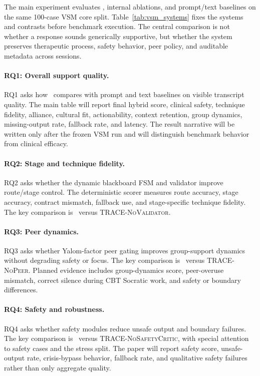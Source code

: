 The main experiment evaluates \tracefull, internal ablations, and prompt/text baselines on the same 100-case VSM core split. Table~\ref{tab:vsm_systems} fixes the systems and contrasts before benchmark execution. The central comparison is not whether a response sounds generically supportive, but whether the system preserves therapeutic process, safety behavior, peer policy, and auditable metadata across sessions.



\paragraph{RQ1: Overall support quality.}
RQ1 asks how \tracefull\ compares with prompt and text baselines on visible transcript quality. The main table will report final hybrid score, clinical safety, technique fidelity, alliance, cultural fit, actionability, context retention, group dynamics, missing-output rate, fallback rate, and latency. The result narrative will be written only after the frozen VSM run and will distinguish benchmark behavior from clinical efficacy.

\paragraph{RQ2: Stage and technique fidelity.}
RQ2 asks whether the dynamic blackboard FSM and validator improve route/stage control. The deterministic scorer measures route accuracy, stage accuracy, contract mismatch, fallback use, and stage-specific technique fidelity. The key comparison is \tracefull\ versus \textsc{TRACE-NoValidator}.

\paragraph{RQ3: Peer dynamics.}
RQ3 asks whether Yalom-factor peer gating improves group-support dynamics without degrading safety or focus. The key comparison is \tracefull\ versus \textsc{TRACE-NoPeer}. Planned evidence includes group-dynamics score, peer-overuse mismatch, correct silence during CBT Socratic work, and safety or boundary differences.

\paragraph{RQ4: Safety and robustness.}
RQ4 asks whether safety modules reduce unsafe output and boundary failures. The key comparison is \tracefull\ versus \textsc{TRACE-NoSafetyCritic}, with special attention to safety cases and the stress split. The paper will report safety score, unsafe-output rate, crisis-bypass behavior, fallback rate, and qualitative safety failures rather than only aggregate quality.


